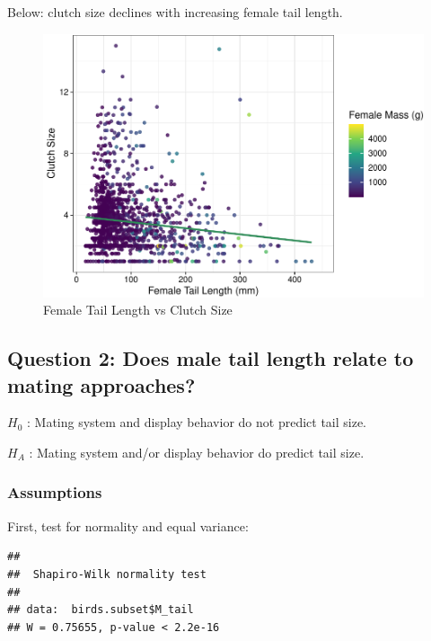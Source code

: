\documentclass[
  12pt,
]{article}
\begin{document}
Below: clutch size declines with increasing female tail length.

\begin{figure}
\centering
\includegraphics{Project_Code_files/figure-latex/q-1_plot_main-1.pdf}
\caption{Female Tail Length vs Clutch Size}
\end{figure}

\newpage

\hypertarget{question-2-does-male-tail-length-relate-to-mating-approaches}{%
\subsection{Question 2: Does male tail length relate to mating
approaches?}\label{question-2-does-male-tail-length-relate-to-mating-approaches}}

\(H_0\) : Mating system and display behavior do not predict tail size.

\(H_A\) : Mating system and/or display behavior do predict tail size.

\hypertarget{assumptions-1}{%
\subsubsection{Assumptions}\label{assumptions-1}}

First, test for normality and equal variance:

\begin{verbatim}
## 
##  Shapiro-Wilk normality test
## 
## data:  birds.subset$M_tail
## W = 0.75655, p-value < 2.2e-16
\end{verbatim}
\end{document}
